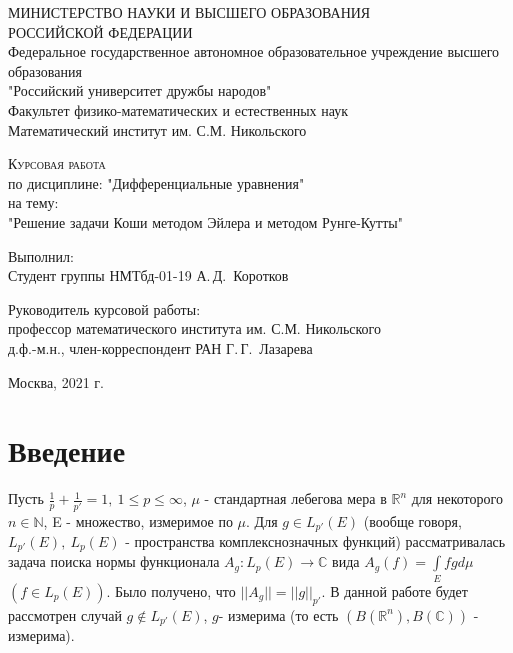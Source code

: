 \documentclass[a4paper,14pt]{article}
\begin{document}
\begin{titlepage}
  \begin{center}
МИНИСТЕРСТВО НАУКИ И ВЫСШЕГО ОБРАЗОВАНИЯ\\
РОССИЙСКОЙ ФЕДЕРАЦИИ\\
    
Федеральное государственное автономное образовательное учреждение высшего образования\\
"Российский университет дружбы народов"\\
Факультет физико-математических и естественных наук\\
Математический институт им. С.М. Никольского
\vfill
 
\textsc{Курсовая работа}\\[5mm]
по дисциплине: "Дифференциальные уравнения"\\
на тему:\\
"Решение задачи Коши методом Эйлера и методом Рунге-Кутты"
\end{center}
\vfill
 
\newlength{\ML}
\hfill\begin{minipage}{0.4\textwidth}
  Выполнил:\\
  Студент группы НМТбд-01-19
  А.\,Д.~Коротков\\
\end{minipage}

\hfill\begin{minipage}{0.4\textwidth}
  Руководитель курсовой работы:\\
  профессор математического института им. С.М. Никольского\\
  д.ф.-м.н., член-корреспондент РАН
  Г.\,Г.~Лазарева\\
\end{minipage}%
\bigskip
\vfill
 
\begin{center}
  Москва, 2021 г.
\end{center}
\end{titlepage}


\tableofcontents
\newpage
{}

\section{Введение}
Пусть $\frac{1}{p}+\frac{1}{p'}=1,\  1\leq p\leq \infty$, $\mu$ - стандартная лебегова мера в $\mathbb{R}^n$ для некоторого $n\in \mathbb{N}$, E - множество, измеримое по $\mu$. Для $g \in L_{p'}(E)$ (вообще говоря, $L_{p'}(E),\ L_{p}(E)$ - пространства комплекснозначных функций) рассматривалась задача поиска нормы функционала $A_g:L_p(E)\rightarrow \mathbb{C}$ вида
$A_g(f)=\int\limits_{E}fgd\mu$ $(f\in L_p(E))$. Было получено, что $||A_g||=||g||_{p'}$. В данной работе будет рассмотрен случай $g \not \in L_{p'}(E)$, $g$- измерима (то есть $(B(\mathbb{R}^n),B(\mathbb{C}))$ - измерима).
\end{document}

